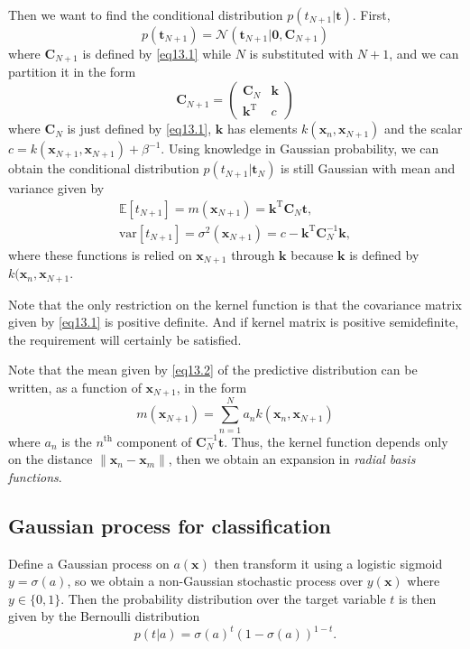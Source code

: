 \documentclass[a4paper]{book}
\newcommand{\normD}{\mathcal{N}}
\newcommand{\mrm}{\mathrm}
\newcommand{\mbf}{\mathbf}
\newcommand{\CC}{\mbf C}
\newcommand{\kk}{\mbf k}
\newcommand{\ttt}{\mbf t}
\newcommand{\xx}{\mbf x}
\newcommand{\bmz}{\bm{0}}
\newcommand{\Exp}{\mathbb{E}}
\newcommand{\rev}{^{-1}}
\newcommand{\trans}{^{\mrm T}}
\begin{document}
Then we want to find the conditional distribution $p(t_{N+1}|\ttt)$. First,
\begin{equation}
    p(\ttt_{N+1}) = \normD(\ttt_{N+1}|\bmz, \CC_{N+1})
\end{equation}
where $\CC_{N+1}$ is defined by \ref{eq13.1} while $N$ is substituted with $N+1$, and we can partition it in the form
\begin{equation}
    \CC_{N+1}=\left(\begin{array}{cc}
         \CC_N & \kk  \\
         \kk\trans & c
    \end{array}\right)
\end{equation}
where $\CC_N$ is just defined by \ref{eq13.1}, $\kk$ has elements $k(\xx_n,\xx_{N+1})$ and the scalar $c = k(\xx_{N+1},\xx_{N+1})+\beta\rev$.
Using knowledge in Gaussian probability, we can obtain the conditional distribution $p(t_{N+1}|\ttt_N)$ is still Gaussian with mean and variance given by
\begin{gather}\label{eq13.2}
    \Exp[t_{N+1}] = m(\xx_{N+1})=\kk\trans\CC_N\ttt, \\
    \mrm{var}[t_{N+1}] = \sigma^2(\xx_{N+1})=c-\kk\trans\CC_N\rev\kk,
\end{gather}
where these functions is relied on $\xx_{N+1}$ through $\kk$ because $\kk$ is defined by $k(\xx_n,\xx_{N+1}$.

Note that the only restriction on the kernel function is that the covariance matrix given by  \ref{eq13.1} is positive definite. And if kernel matrix is positive semidefinite, the requirement will certainly be satisfied.

Note that the mean given by \ref{eq13.2} of the predictive distribution can be written, as a function of $\xx_{N+1}$, in the form
\begin{equation}
    m(\xx_{N+1})=\sum_{n=1}^Na_nk(\xx_n, \xx_{N+1})
\end{equation}
where $a_n$ is the $n^{\mrm{th}}$ component of $\CC_N\rev\ttt$. Thus, the kernel function depends only on the distance $\|\xx_n-\xx_m\|$, then we obtain an expansion in \emph{radial basis functions}.

\subsection{Gaussian process for classification}
Define a Gaussian process on $a(\xx)$ then transform it using a logistic sigmoid $y=\sigma(a)$, so we obtain a non-Gaussian stochastic process over $y(\xx)$ where $y\in\{0,1\}$. Then the probability distribution over the target variable $t$ is then given by the Bernoulli distribution
\begin{equation}
    p(t|a)=\sigma(a)^t(1-\sigma(a))^{1-t}.
\end{equation}
\end{document}
